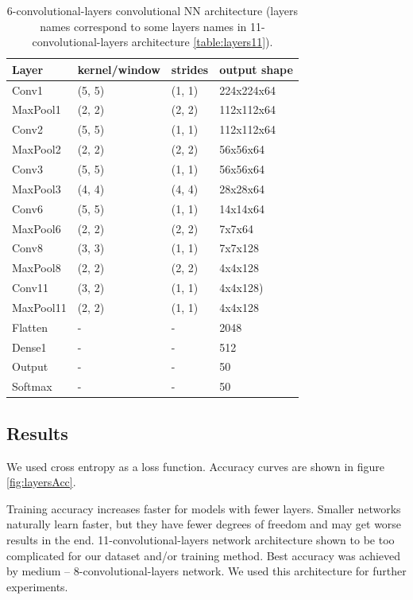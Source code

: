 \documentclass[a4paper]{article}
\begin{document}
\begin{table}[!h]
    \caption{6-convolutional-layers convolutional NN architecture (layers names correspond to some layers names in 11-convolutional-layers architecture \ref{table:layers11}).
    \label{table:layers6}
    }
\begin{center}
    \begin{tabular}{| l | l | l | l |}
    \hline
        Layer & kernel/window& strides & output shape\\
    \hline
        Conv1  & (5, 5)&        (1, 1)&     224x224x64  \\
    \hline
        MaxPool1 & (2, 2)&      (2, 2)&     112x112x64  \\
        Conv2  & (5, 5)&        (1, 1)&     112x112x64  \\
    \hline
        MaxPool2 & (2, 2)&      (2, 2)&     56x56x64    \\
        Conv3  & (5, 5)&        (1, 1)&     56x56x64    \\
    \hline
        MaxPool3 & (4, 4)&      (4, 4)&     28x28x64    \\
        Conv6  & (5, 5)&        (1, 1)&     14x14x64  \\
    \hline
        MaxPool6 & (2, 2)&      (2, 2)&     7x7x64  \\
        Conv8  & (3, 3)&        (1, 1)&     7x7x128\\
    \hline
        MaxPool8 & (2, 2)&      (2, 2)&     4x4x128  \\
        Conv11 & (3, 2)&        (1, 1)&     4x4x128)\\  %
    \hline
        MaxPool11 & (2, 2)&      (1, 1)&     4x4x128  \\
        Flatten & - & - & 2048 \\
        Dense1 & - & - & 512 \\
    \hline
        Output & - & - & 50 \\
        Softmax & - & - & 50 \\
    \hline
    \end{tabular}
\end{center}
\end{table}

\subsection{Results}
We used cross entropy as a loss function.
Accuracy curves are shown in figure \ref{fig:layersAcc}.

Training accuracy increases faster for models with fewer layers.
Smaller networks naturally learn faster, but they have fewer degrees of freedom
and may get worse results in the end.
11-convolutional-layers network architecture shown to be too complicated for
our dataset and/or training method.
Best accuracy was achieved by medium -- 8-convolutional-layers network.
We used this architecture for further experiments.
\end{document}

